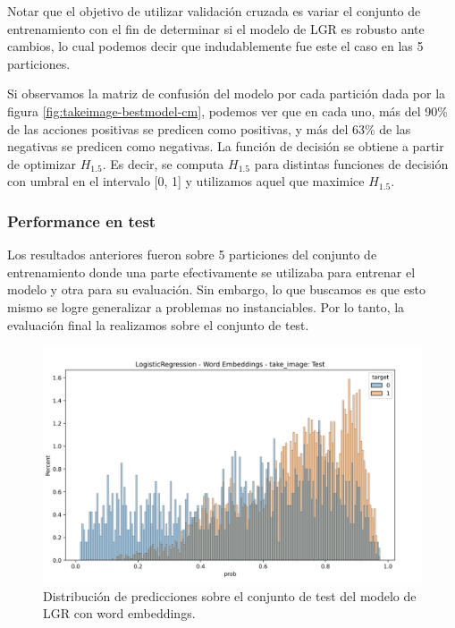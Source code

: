Notar que el objetivo de utilizar validación cruzada es variar el conjunto de
entrenamiento con el fin de determinar si el modelo de LGR es robusto ante
cambios, lo cual podemos decir que indudablemente fue este el caso en las 5
particiones.

Si observamos la matriz de confusión del modelo por cada partición dada por la
figura \ref{fig:takeimage-bestmodel-cm}, podemos ver que en cada uno, más del
90\% de las acciones positivas se predicen como positivas, y más del 63\% de las
negativas se predicen como negativas. La función de decisión se obtiene a partir
de optimizar $H_{1.5}$. Es decir, se computa $H_{1.5}$ para distintas
funciones de decisión con umbral en el intervalo [0, 1] y utilizamos aquel que
maximice $H_{1.5}$. 

\subsubsection{Performance en test}

Los resultados anteriores fueron sobre 5 particiones del conjunto de
entrenamiento donde una parte efectivamente se utilizaba para entrenar el modelo
y otra para su evaluación. Sin embargo, lo que buscamos es que esto mismo se
logre generalizar a problemas no instanciables. Por lo tanto, la evaluación
final la realizamos sobre el conjunto de test.

\begin{figure}[b!]
    \centering
    \includegraphics[width=\linewidth]{figures/results/word_embeddings/lgr/take_image/lgr_wb_take_image_test.png}
    \caption{Distribución de predicciones sobre el conjunto de test del modelo de LGR con word embeddings.}
    \label{fig:takeimage-bestmodel-distplot-test}
\end{figure}

